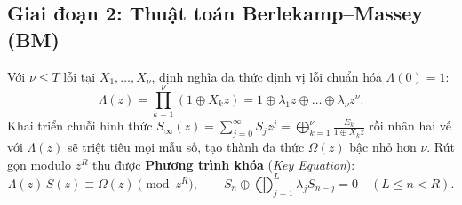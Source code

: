 \subsection{Giai đoạn 2: Thuật toán Berlekamp--Massey (BM)}

Với $\nu \le T$ lỗi tại $X_1, \dots, X_\nu$, định nghĩa đa thức định vị lỗi chuẩn hóa $\Lambda(0) = 1$:
\begin{equation}
\Lambda(z) = \prod_{k=1}^{\nu} (1 \oplus X_k z) = 1 \oplus \lambda_1 z \oplus \dots \oplus \lambda_\nu z^\nu.
\label{eq:lambda_def}
\end{equation}
Khai triển chuỗi hình thức $S_\infty(z) = \sum_{j=0}^{\infty} S_j z^j = \bigoplus_{k=1}^{\nu} \frac{E_k}{1 \oplus X_k z}$ rồi nhân hai vế với $\Lambda(z)$ sẽ triệt tiêu mọi mẫu số, tạo thành đa thức $\Omega(z)$ bậc nhỏ hơn $\nu$. Rút gọn modulo $z^R$ thu được \textbf{Phương trình khóa} (\textit{Key Equation}):
\begin{equation}
\Lambda(z)\,S(z) \equiv \Omega(z) \pmod{z^R}, \qquad S_n \oplus \bigoplus_{j=1}^{L} \lambda_j S_{n-j} = 0 \quad (L \le n < R).
\label{eq:key_equation}
\end{equation}

